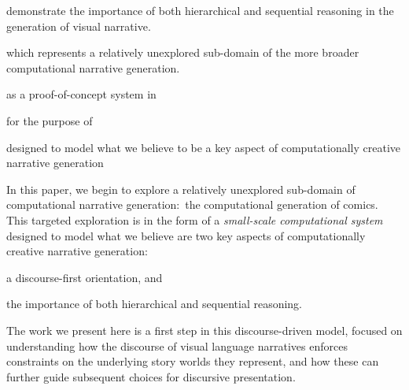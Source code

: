  demonstrate the importance of both hierarchical and sequential reasoning in the
 generation of visual narrative.




 which represents a relatively unexplored sub-domain of the more broader
 computational narrative generation.


as a proof-of-concept system in


for the purpose of


designed to model what we believe to be a key aspect of computationally creative
narrative generation





In this paper, we begin to explore a relatively unexplored sub-domain of
computational narrative generation:~the computational generation of comics. This
targeted exploration is in the form of a \emph{small-scale computational
system}~\cite{montfort2012small} designed to model what we believe are two key
aspects of computationally creative narrative generation:
%
\begin{inparaenum}[] \item a discourse-first orientation, and \item the
importance of both hierarchical and sequential reasoning. \end{inparaenum}










The work we present here is a first step in this discourse-driven model, focused
on understanding how the discourse of visual language narratives enforces
constraints on the underlying story worlds they represent, and how these can
further guide subsequent choices for discursive presentation.





























